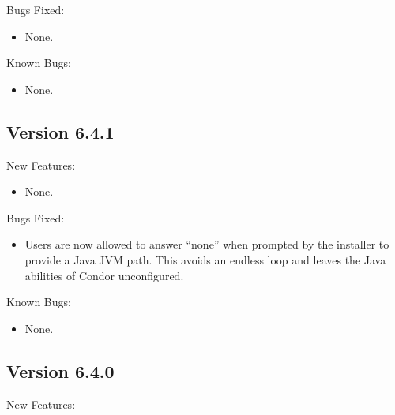 \noindent Bugs Fixed:
\begin{itemize}
\item None.

\end{itemize}
\noindent Known Bugs:
\begin{itemize}

\item None.

\end{itemize}

\subsection{\label{sec:New-6-4-1}Version 6.4.1}
\noindent New Features:
\begin{itemize}

\item None.

\end{itemize}

\noindent Bugs Fixed:
\begin{itemize}

\item Users are now allowed to answer ``none'' when prompted by the
installer to provide a Java JVM path. This avoids an endless loop and
leaves the Java abilities of Condor unconfigured.

\end{itemize}

\noindent Known Bugs:
\begin{itemize}

\item None.

\end{itemize}

\subsection{\label{sec:New-6-4-0}Version 6.4.0}

\noindent New Features:

